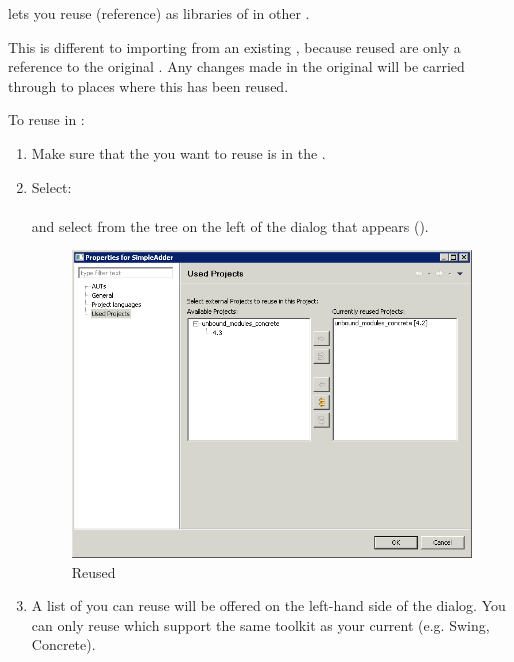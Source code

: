 \app{} lets you reuse (reference) \gdprojects{} as libraries of \gdcases{} in other \gdprojects{}. 

This is different to importing \gdcases{} from an existing \gdproject{} , because reused \gdprojects{} are only a reference to the original \gdproject{}. Any changes made in the original \gdproject{} will be carried through to places where this \gdproject{} has been reused. 

To reuse \gdprojects{} in \app{}:
\begin{enumerate}
\item Make sure that the \gdproject{} you want to reuse is in the \gddb{}.
\item Select:\\
\\
and select  from the tree on the left of the dialog that appears ().

\begin{figure}[h]
\begin{center}
\includegraphics[width=12.5cm]{Tasks/Projects/PS/reuseproject}
\caption{Reused \gdprojects{}}
\label{reuseproject}
\end{center}
\end{figure}

\item A list of \gdprojects{} you can reuse will be offered on the left-hand side of the dialog. You can only reuse \gdprojects{} which support the same toolkit as your current \gdproject{} (e.g. Swing, Concrete).


\end{enumerate}
